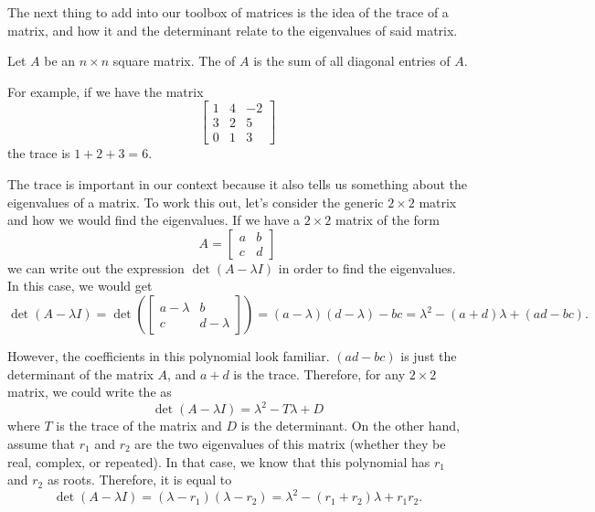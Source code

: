 \documentclass{ximera}
\begin{document}
The next thing to add into our toolbox of matrices is the idea of the trace of a matrix, and how it and the determinant relate to the eigenvalues of said matrix.

\begin{definition}
    Let $A$ be an $n \times n$ square matrix. The \emph{} of $A$ is the sum of all diagonal entries of $A$.
\end{definition}

For example, if we have the matrix
\begin{equation*}
    \begin{bmatrix}
        1 & 4 & -2 \\
        3 & 2 & 5 \\
        0 & 1 & 3
    \end{bmatrix}
\end{equation*}
the trace is $1 + 2 + 3 = 6$.

The trace is important in our context because it also tells us something about the eigenvalues of a matrix. To work this out, let's consider the generic $2\times 2$ matrix and how we would find the eigenvalues. If we have a $2 \times 2$ matrix of the form
\begin{equation*}
    A = 
    \begin{bmatrix} 
        a & b \\ 
        c & d
    \end{bmatrix}
\end{equation*}
we can write out the expression $\det(A - \lambda I)$ in order to find the eigenvalues. In this case, we would get
\begin{equation*}
    \det(A - \lambda I) = \det\left( \begin{bmatrix} a - \lambda & b \\ c & d - \lambda \end{bmatrix} \right) = (a-\lambda)(d-\lambda) - bc = \lambda^2 - (a+d)\lambda + (ad - bc).
\end{equation*}

However, the coefficients in this polynomial look familiar. $(ad-bc)$ is just the determinant of the matrix $A$, and $a+d$ is the trace. Therefore, for any $2 \times 2$ matrix, we could write the  as 
\begin{equation}
    \det(A - \lambda I) = \lambda^2 - T\lambda + D \label{eq:CharPoly1}
\end{equation}
where $T$ is the trace of the matrix and $D$ is the determinant. On the other hand, assume that $r_1$ and $r_2$ are the two eigenvalues of this matrix (whether they be real, complex, or repeated). In that case, we know that this polynomial has $r_1$ and $r_2$ as roots. Therefore, it is equal to
\begin{equation}
    \det(A - \lambda I) = (\lambda - r_1)(\lambda - r_2) = \lambda^2 - (r_1 + r_2)\lambda + r_1r_2. \label{eq:CharPoly2}
\end{equation}
\end{document}
